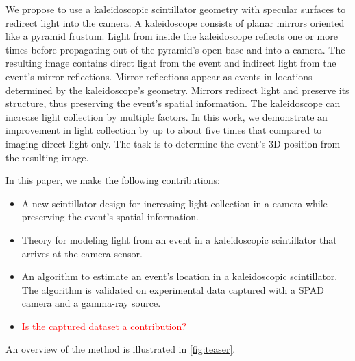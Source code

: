 We propose to use a kaleidoscopic scintillator geometry with specular surfaces to 
redirect light into the camera.
A kaleidoscope consists of planar mirrors oriented like a pyramid frustum.
Light from inside the kaleidoscope reflects one or more times before 
propagating out of the pyramid's open base and into a camera.
The resulting image contains direct light from the event and indirect light from 
the event's mirror reflections. 
Mirror reflections appear as events in locations determined by the kaleidoscope's geometry.
Mirrors redirect light and preserve its structure, thus preserving the event's 
spatial information.
The kaleidoscope can increase light collection by multiple factors.
In this work, we demonstrate an improvement in light collection by up to about 
five times that compared to imaging direct light only.
The task is to determine the event's 3D position from the resulting image.



In this paper, we make the following contributions: 
\begin{itemize}
\item A new scintillator design for increasing light collection in a camera while 
preserving the event's spatial information.
\item Theory for modeling light from an event in a kaleidoscopic scintillator that 
arrives at the camera sensor.
\item An algorithm to estimate an event's location in a kaleidoscopic scintillator. 
The algorithm is validated on experimental data captured with a SPAD camera and a 
gamma-ray source.
\item \textcolor{red}{Is the captured dataset a contribution?}
\end{itemize}
An overview of the method is illustrated in \cref{fig:teaser}.



